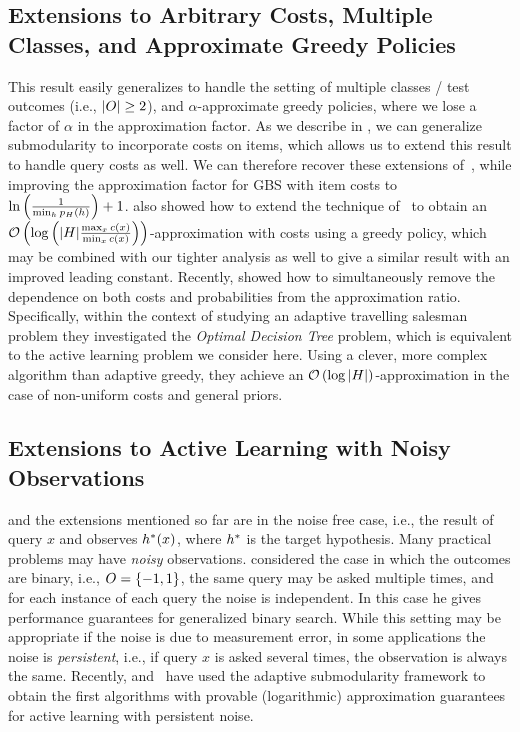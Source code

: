 \subsection{Extensions to Arbitrary
  Costs, Multiple Classes, and Approximate Greedy Policies}  
This result easily generalizes to handle 
the setting of multiple classes / test outcomes  (i.e., $|O| \ge 2$), and
$\alpha$-approximate greedy policies, where we lose a factor of
$\alpha$ in the approximation factor.  
As we describe
in \appendixA,
we can 
generalize \term submodularity to incorporate costs on items,
which allows us to extend this result to handle query costs as well.   
We can therefore
recover these extensions 
of~\citet{guillory09}, while improving the approximation factor
for GBS with item costs 
to $\ln  \left( {\frac{1}{\min_{h}  p_{H}(h)}} \right)  + 1$.  
\citeauthor{guillory09} 
also showed how to extend the
technique of~\citet{kosaraju99} to obtain an ${\mathcal{O}} \left( {\log
 \left( {|H|\frac{\max_{x} c(x)}{\min_{x}
    c(x)}} \right) } \right) $-approximation with costs using a greedy policy, which
may be combined with our tighter analysis 
as well to give a similar result with an improved leading constant.
%
Recently, \citet{gupta10approximation} showed how to simultaneously remove the
dependence on both costs and probabilities from the approximation ratio.
Specifically, within the context of studying an adaptive travelling
salesman problem 
they investigated the \emph{Optimal Decision Tree} problem, which is
equivalent to the active learning problem we consider here.  Using a clever, more
complex algorithm than adaptive greedy, 
they achieve an ${\mathcal{O}} \left( {\log |H|} \right) $-approximation
in the case of non-uniform  costs and general priors.  

\subsection{Extensions to Active Learning with Noisy Observations}  
 and the extensions mentioned so far
are in the noise free case, i.e., the result of query $x$ and observes
$h^*(x)$, where $h^*$ is the target hypothesis.
Many practical problems may have \emph{noisy} observations.
\citet{nowak09} considered the case in which the outcomes are binary,
i.e., $O = \left\{-1,1\right\}$, the same query may be asked multiple
times, and for each instance of each query the noise is independent.
In this case he gives performance guarantees for generalized binary
search.  While this setting may be appropriate if the noise is due to
measurement error, in some applications the noise is
\emph{persistent}, i.e., if query $x$ is asked several times, the observation
is always the same.  Recently, \citet{golovin10nips}
and~\citet{bellala10modified} have used the adaptive submodularity framework to obtain 
the first algorithms with provable (logarithmic) approximation guarantees for 
active learning with persistent noise.


%
%
%
%
%
